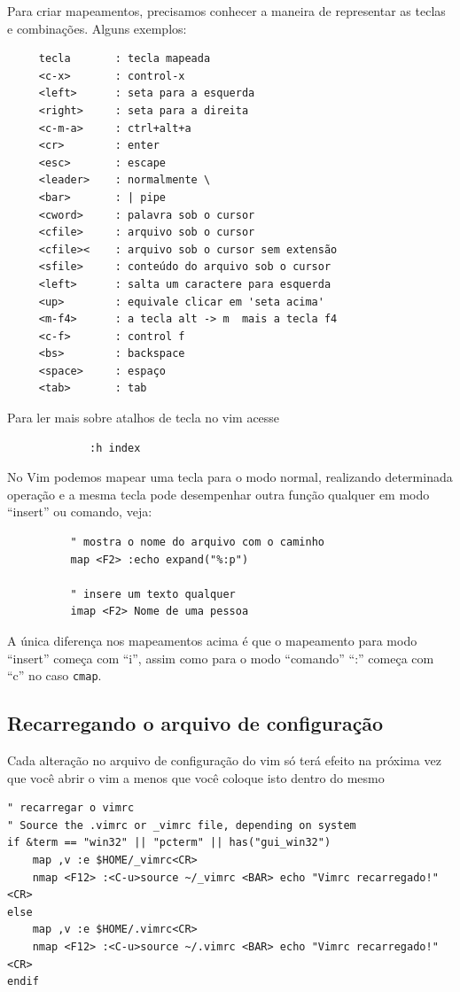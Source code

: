 \documentclass[10pt,a4paper,openany]{book}
\begin{document}
Para criar mapeamentos, precisamos conhecer a maneira de representar
as teclas e combinações. Alguns exemplos:

\begin{verbatim}
	 tecla       : tecla mapeada
	 <c-x>       : control-x
	 <left>	     : seta para a esquerda
	 <right>     : seta para a direita
	 <c-m-a>     : ctrl+alt+a
	 <cr>        : enter
	 <esc>       : escape
	 <leader>    : normalmente \
	 <bar>       : | pipe
	 <cword>     : palavra sob o cursor
	 <cfile>     : arquivo sob o cursor
	 <cfile><    : arquivo sob o cursor sem extensão
	 <sfile>     : conteúdo do arquivo sob o cursor
	 <left>      : salta um caractere para esquerda
	 <up>        : equivale clicar em 'seta acima'
	 <m-f4>      : a tecla alt -> m  mais a tecla f4
	 <c-f>       : control f
	 <bs>        : backspace
	 <space>     : espaço
	 <tab>       : tab
\end{verbatim}

Para ler mais sobre atalhos de tecla no vim acesse 

\begin{verbatim}
             :h index
\end{verbatim}

No Vim podemos mapear uma tecla para o modo normal, realizando
determinada operação e a mesma tecla pode desempenhar outra função
qualquer em modo ``insert'' ou comando, veja:

\begin{verbatim}
		  " mostra o nome do arquivo com o caminho
		  map <F2> :echo expand("%:p")

		  " insere um texto qualquer
		  imap <F2> Nome de uma pessoa
\end{verbatim}

A única diferença nos mapeamentos acima é que o mapeamento para modo
``insert'' começa com ``i'', assim como para o modo ``comando'' ``:'' começa
com ``c'' no caso \verb|cmap|.

\subsection{Recarregando o arquivo de configuração}
\label{sec:Recarregando o arquivo de configuração}

Cada alteração no arquivo de configuração do vim só terá efeito na próxima vez que você
abrir o vim a menos que você coloque isto dentro do mesmo

\begin{verbatim}
" recarregar o vimrc
" Source the .vimrc or _vimrc file, depending on system
if &term == "win32" || "pcterm" || has("gui_win32")
	map ,v :e $HOME/_vimrc<CR>
	nmap <F12> :<C-u>source ~/_vimrc <BAR> echo "Vimrc recarregado!"<CR>
else
	map ,v :e $HOME/.vimrc<CR>
	nmap <F12> :<C-u>source ~/.vimrc <BAR> echo "Vimrc recarregado!"<CR>
endif
\end{verbatim}
\end{document}
